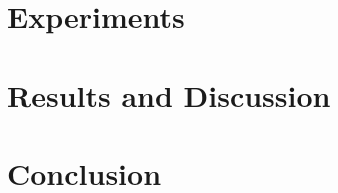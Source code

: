 \documentclass[doktyp=marbeit,fontsize=12pt,sprache=english,hausschrift=true,draft=false]{TUBAFarbeiten}
\begin{document}
\section{Experiments}





\newpage

\section{Results and Discussion}\label{sec:results}






\newpage

\section{Conclusion}



\newpage
\end{document}
